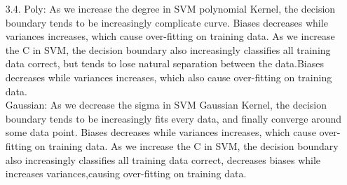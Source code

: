 \documentclass[12pt]{article}
\begin{document}
\begin{itemize}

\item[3.4. ] \smallskip 
Poly: As we increase the degree in SVM polynomial Kernel, the decision boundary tends to be increasingly complicate curve. Biases decreases while variances increases,  which cause over-fitting on training data. As we increase the C in SVM, the decision boundary also increasingly classifies all training data correct, but tends to lose natural separation between the data.Biases decreases while variances increases,  which also cause over-fitting on training data.\\
Gaussian: 
As we decrease the sigma in SVM Gaussian Kernel, the decision boundary tends to be increasingly fits every data, and finally converge around some data point. Biases decreases while variances increases,  which cause over-fitting on training data.  As we increase the C in SVM, the decision boundary also increasingly classifies all training data correct, decreases biases while increases variances,causing over-fitting on training data.\\    



\end{itemize}
\end{document}
